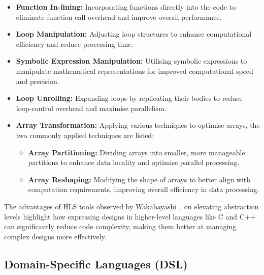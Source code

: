 \begin{itemize}
    \item \textbf{Function In-lining:} Incorporating functions directly into the code to eliminate function call overhead and improve overall performance.
    
    \item \textbf{Loop Manipulation:} Adjusting loop structures to enhance computational efficiency and reduce processing time.
    
    \item \textbf{Symbolic Expression Manipulation:} Utilising symbolic expressions to manipulate mathematical representations for improved computational speed and precision.
    
    \item \textbf{Loop Unrolling:} Expanding loops by replicating their bodies to reduce loop-control overhead and maximise parallelism.

    \item \textbf{Array Transformation:} Applying various techniques to optimise arrays, the two commonly applied techniques are listed:
        \begin{itemize}
            \item \textbf{Array Partitioning:} Dividing arrays into smaller, more manageable partitions to enhance data locality and optimise parallel processing.
            \item \textbf{Array Reshaping:} Modifying the shape of arrays to better align with computation requirements, improving overall efficiency in data processing.
        \end{itemize}
        
\end{itemize}
 
The advantages of HLS tools observed by Wakabayashi~\etal\cite{Kaz04}, on elevating abstraction levels highlight how expressing designs in higher-level languages like C and C++ can significantly reduce code complexity, making them better at managing complex designs more effectively.



\subsection*{Domain-Specific Languages (DSL)}


